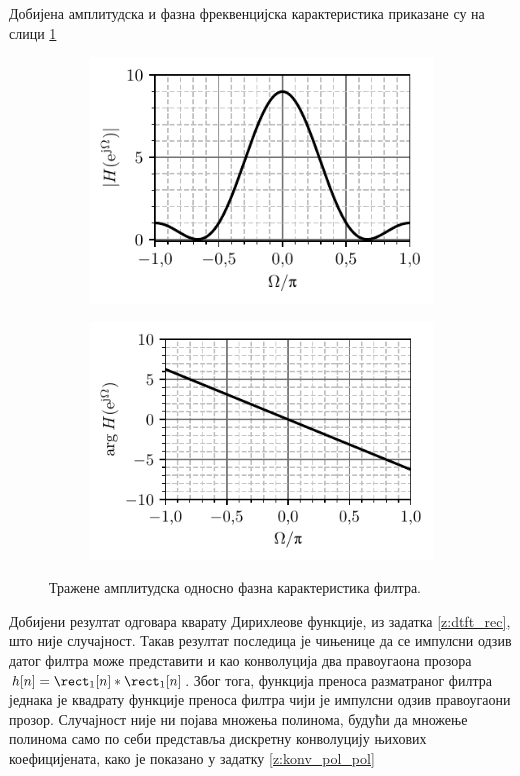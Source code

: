 Добијена амплитудска и фазна фреквенцијска карактеристика приказане су на слици \ref{fig:\ID.hz}
\begin{figure}
    \centering
    \begin{subfigure}{0.49\textwidth}
        \centering
        \includegraphics{fig/zt_tri.pdf}
    \end{subfigure}
    \begin{subfigure}{0.49\textwidth}
        \centering
        \includegraphics{fig/zt_tri_faz.pdf}
    \end{subfigure}
    \caption{Тражене амплитудска односно фазна карактеристика филтра.}
    \label{fig:\ID.hz}
\end{figure}

Добијени резултат одговара кварату Дирихлеове функције, из задатка \ref{z:dtft_rec}, што није случајност. 
Такав резултат последица је чињенице да се импулсни одзив датог филтра може представити и као 
конволуција два правоугаона прозора $h[n] = \rect_1[n] \ast \rect_1[n]$. Због тога, функција преноса 
разматраног филтра једнака је квадрату функције преноса 
филтра чији је импулсни одзив правоугаони прозор. Случајност није ни појава множења полинома, будући да множење полинома само по 
себи представља дискретну конволуцију њихових коефицијената, како је показано у задатку \ref{z:konv_pol_pol}
